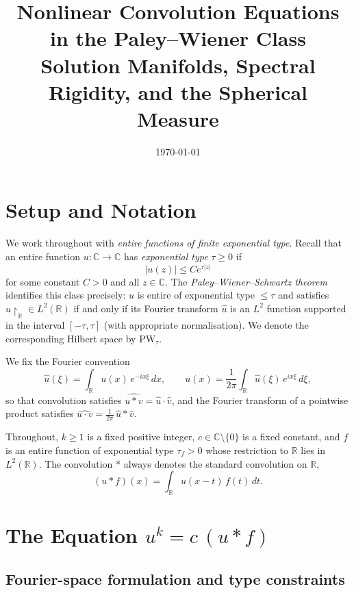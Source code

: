 \documentclass[12pt]{article}
\title{\textbf{Nonlinear Convolution Equations\\in the Paley--Wiener Class}\\[0.5em]
\large Solution Manifolds, Spectral Rigidity, and the Spherical Measure}
\author{}
\date{\today}
\newcommand{\R}{\mathbb{R}}
\newcommand{\C}{\mathbb{C}}
\newcommand{\PW}{\mathrm{PW}}
\newcommand{\wh}{\widehat}
\newcommand{\abs}[1]{\left|#1\right|}
\begin{document}
\maketitle
\tableofcontents
\bigskip

\section{Setup and Notation}

We work throughout with \emph{entire functions of finite exponential type}.
Recall that an entire function $u : \C \to \C$ has \emph{exponential type}
$\tau \geq 0$ if
\[
  \abs{u(z)} \leq C e^{\tau\abs{z}}
\]
for some constant $C > 0$ and all $z \in \C$.
The \emph{Paley--Wiener--Schwartz theorem} identifies this class precisely:
$u$ is entire of exponential type $\leq \tau$ and satisfies
$u\!\restriction_{\R} \in L^2(\R)$ if and only if its Fourier transform
$\wh{u}$ is an $L^2$ function supported in the interval $[-\tau, \tau]$
(with appropriate normalisation).
We denote the corresponding Hilbert space by $\PW_\tau$.

We fix the Fourier convention
\[
  \wh{u}(\xi) = \int_{\R} u(x)\,e^{-ix\xi}\,dx,
  \qquad
  u(x) = \frac{1}{2\pi}\int_{\R}\wh{u}(\xi)\,e^{ix\xi}\,d\xi,
\]
so that convolution satisfies $\widehat{u\ast v} = \wh{u}\cdot\wh{v}$,
and the Fourier transform of a pointwise product satisfies
$\widehat{u\cdot v} = \tfrac{1}{2\pi}\,\wh{u}\ast\wh{v}$.

Throughout, $k \geq 1$ is a fixed positive integer, $c \in \C\setminus\{0\}$
is a fixed constant, and $f$ is an entire function of exponential type
$\tau_f > 0$ whose restriction to $\R$ lies in $L^2(\R)$.
The convolution $\ast$ always denotes the standard convolution on $\R$,
\[
  (u \ast f)(x) = \int_{\R} u(x-t)\,f(t)\,dt.
\]

\section{The Equation \texorpdfstring{$u^k = c\,(u \ast f)$}{uk = c(u*f)}}

\subsection{Fourier-space formulation and type constraints}
\end{document}
